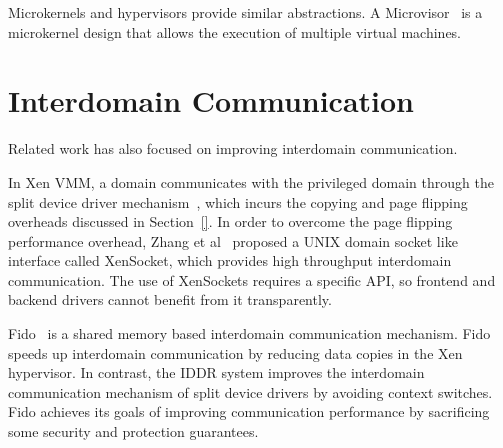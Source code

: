Microkernels and hypervisors provide similar abstractions\cite{are microkernels ... done right 2papers}.
A Microvisor~\cite{Heiser+:acm10} is a microkernel design that allows
the execution of multiple virtual machines.

\section{Interdomain Communication}
\label{sec:interdomain}
Related work has also focused on improving interdomain communication.

In Xen VMM, a domain communicates with the privileged domain
through the split device driver mechanism~\cite{Fraser04safehardware},
which incurs the copying and page flipping overheads discussed in Section~\ref{}.
In order to overcome the page flipping performance overhead, 
Zhang et al~\cite{Zhang:2007:XHI:1516124.1516138} proposed a UNIX domain socket 
like interface called XenSocket, which provides high throughput 
interdomain communication.  The use of XenSockets requires a specific API,
so frontend and backend drivers cannot benefit from it transparently.

Fido~\cite{Burtsev:2009:FFI:1855807.1855832} is a shared memory
based interdomain communication mechanism. Fido speeds up
interdomain communication by reducing data copies in the
Xen hypervisor. In contrast, the IDDR system improves the interdomain
communication mechanism of split device drivers by avoiding context
switches. Fido achieves its goals of improving communication performance
by sacrificing some security and protection guarantees.

